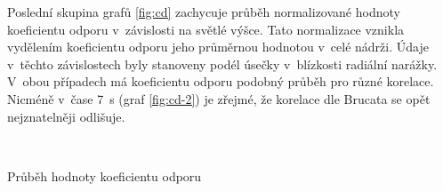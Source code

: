 Poslední skupina grafů \ref{fig:cd} zachycuje průběh normalizované hodnoty koeficientu odporu v~závislosti na světlé výšce. Tato normalizace vznikla vydělením koeficientu odporu jeho průměrnou hodnotou v~celé nádrži. Údaje v~těchto závislostech byly stanoveny podél úsečky v~blízkosti radiální narážky.  V~obou případech má  koeficientu odporu podobný průběh pro různé korelace. Nicméně v~čase \SI{7}{\second} (graf \ref{fig:cd-2}) je zřejmé, že korelace dle Brucata se opět nejznatelněji odlišuje.

\begin{grf}[h!]
 \centering
  \\ 
  \caption{Průběh hodnoty koeficientu odporu}
  \label{fig:cd}
\end{grf}
\newpage

